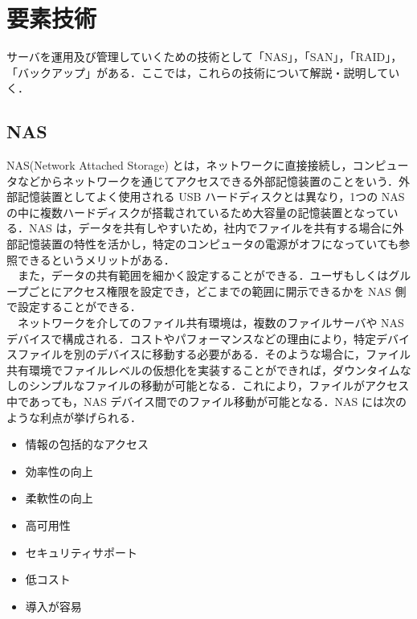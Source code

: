 \documentclass[a4j,titlepage]{jarticle}
\begin{document}
\newpage
\section{要素技術}
サーバを運用及び管理していくための技術として「NAS」，「SAN」，「RAID」，「バックアップ」がある．ここでは，これらの技術について解説・説明していく．


\subsection{NAS}
NAS(Network Attached Storage) とは，ネットワークに直接接続し，コンピュータなどからネットワークを通じてアクセスできる外部記憶装置のことをいう．外部記憶装置としてよく使用される USB ハードディスクとは異なり，1つの NAS の中に複数ハードディスクが搭載されているため大容量の記憶装置となっている．NAS は，データを共有しやすいため，社内でファイルを共有する場合に外部記憶装置の特性を活かし，特定のコンピュータの電源がオフになっていても参照できるというメリットがある．\\
　また，データの共有範囲を細かく設定することができる．ユーザもしくはグループごとにアクセス権限を設定でき，どこまでの範囲に開示できるかを NAS 側で設定することができる\cite{bib:nastext}．\\
　ネットワークを介してのファイル共有環境は，複数のファイルサーバや NAS デバイスで構成される．コストやパフォーマンスなどの理由により，特定デバイスファイルを別のデバイスに移動する必要がある．そのような場合に，ファイル共有環境でファイルレベルの仮想化を実装することができれば，ダウンタイムなしのシンプルなファイルの移動が可能となる．これにより，ファイルがアクセス中であっても，NAS デバイス間でのファイル移動が可能となる\cite{bib:santext}．NAS には次のような利点が挙げられる．

\begin{itemize}
\item 情報の包括的なアクセス

\item 効率性の向上
  
\item 柔軟性の向上

\item 高可用性

\item セキュリティサポート

\item 低コスト

\item 導入が容易

\end{itemize}
\end{document}
